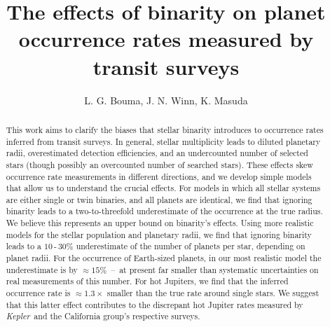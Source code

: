 \documentclass[12pt,modern]{aastex61}
\begin{document}
    
\title{ The effects of binarity on planet occurrence rates measured by transit 
surveys}

\author{
L. G. Bouma, J. N. Winn, K. Masuda
}

\begin{abstract}

This work aims to clarify the biases that stellar binarity introduces
to occurrence rates inferred from transit surveys.
In general, stellar multiplicity leads to diluted planetary 
radii, overestimated detection efficiencies, and an undercounted number of 
selected stars (though possibly an overcounted number of searched stars).
These effects skew occurrence rate measurements in different directions, and 
we develop simple models that allow us to understand the crucial effects.
For models in which all stellar systems are either single or twin binaries, 
and all planets are identical, we find that ignoring binarity leads to a
two-to-threefold underestimate of the occurrence at the true radius.
We believe this represents an upper bound on binarity's effects.
Using more realistic models for the stellar population and planetary 
radii, we find that ignoring binarity leads to a $10$\,-\,$30\%$ 
underestimate of the number of planets per star, depending on planet radii.
For the occurrence of Earth-sized planets, in our most realistic model the 
underestimate is by $\approx 15\%$~--~at present far smaller than 
systematic uncertainties on real measurements of this number.
For hot Jupiters, we find that the inferred occurrence rate is 
$\approx 1.3\times$ smaller than the true rate around single stars.
We suggest that this latter effect contributes to the discrepant hot Jupiter 
rates measured by {\it Kepler}\ and the California group's respective surveys.
\end{abstract}










\end{document}
